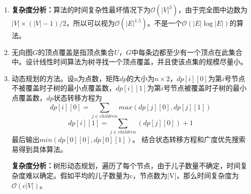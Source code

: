 \documentclass[12pt,a4paper]{article}
\makeatletter
\newtheorem*{solution}{Solution}
\theoremstyle{definition}
\renewenvironment{solution}[1][Solution] {\par\pushQED{\qed}\normalfont\topsep6\p@\@plus6\p@\relax\trivlist\item[\hskip\labelsep\bfseries#1\@addpunct{.}]\ignorespaces}{\popQED\endtrivlist\@endpefalse} \makeatother
\makeatother
\begin{document}
\begin{enumerate}
\begin{solution}
\begin{center}
	\textbf{复杂度分析：}算法的时间复杂性最坏情况下为$\mathcal{O}(|V|^3)$，由于完全图中边数为$|V|\times(|V|-1)/2$，所以可以视为$\mathcal{O}(|E|^{1.5})$。不是一个$\mathcal{O}(|E|\log |E|)$的算法。
	\end{center}
\end{solution}

\item 无向图$G$的顶点覆盖是指顶点集合$U$，$G$中每条边都至少有一个顶点在此集合中。设计线性时间算法为树寻找一个顶点覆盖，并且使该点集的规模尽量小。
\begin{solution}
	动态规划的方法。设n为点数，矩阵$dp$的大小为$n\times 2$，$dp[i][0]$为第$i$号节点不被覆盖时子树的最小点覆盖数，$dp[i][1]$为第$i$号节点被覆盖时子树的最小点覆盖数，$dp$状态转移方程为$$dp[i][0]=\sum_{j\in children}max(dp[j][0],dp[j][1])$$$$dp[i][1]=\sum_{j\in children}(dp[j][0])+1$$
	最后输出$min(dp[0][0],dp[0][1])$。
	结合状态转移方程和广度优先搜索易得到具体算法。
	
	\textbf{复杂度分析：}树形动态规划，遍历了每个节点，由于儿子数量不确定，时间复杂度难以确定。假如平均的儿子数量为c，节点数为|V|，那么时间复杂度为$\mathcal{O}(c|V|)$。
\end{solution}
\end{enumerate}

\end{document}
